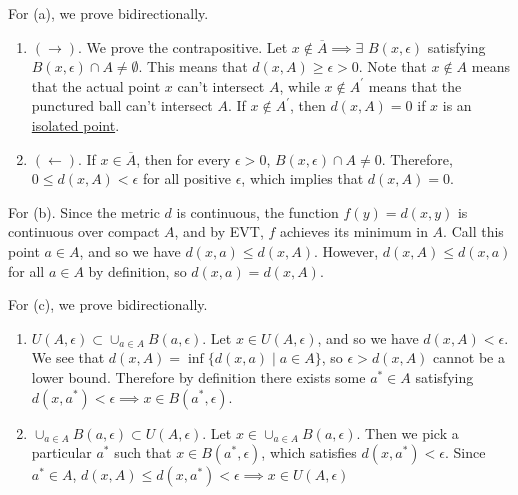   \begin{solution}
    For (a), we prove bidirectionally. 
    \begin{enumerate}
      \item $(\rightarrow)$. We prove the contrapositive. Let $x \not\in \overline{A} \implies \exists$ $B(x, \epsilon)$ satisfying $B(x, \epsilon) \cap A \neq \emptyset$. This means that $d(x, A) \geq \epsilon > 0$. Note that $x \not\in A$ means that the actual point $x$ can't intersect $A$, while $x \not\in A^\prime$ means that the punctured ball can't intersect $A$. If $x \not\in A^\prime$, then $d(x, A) = 0$ if $x$ is an \hyperref[def:isolated-point]{isolated point}. 

      \item $(\leftarrow)$. If $x \in \overline{A}$, then for every $\epsilon > 0$, $B(x, \epsilon) \cap A \neq 0$. Therefore, $0 \leq d(x, A) < \epsilon$ for all positive $\epsilon$, which implies that $d(x, A) = 0$. 
    \end{enumerate}
    For (b). Since the metric $d$ is continuous, the function $f(y) = d(x, y)$ is continuous over compact $A$, and by EVT, $f$ achieves its minimum in $A$. Call this point $a \in A$, and so we have $d(x, a) \leq d(x, A)$. However, $d(x, A) \leq d(x, a)$ for all $a \in A$ by definition, so $d(x, a) = d(x, A)$. 

    For (c), we prove bidirectionally. 
    \begin{enumerate}
      \item $U(A, \epsilon) \subset \cup_{a \in A} B(a, \epsilon)$. Let $x \in U(A, \epsilon)$, and so we have $d(x, A) < \epsilon$. We see that $d(x, A) = \inf \{d(x, a) \mid a \in A\}$, so $\epsilon > d(x, A)$ cannot be a lower bound. Therefore by definition there exists some $a^\ast \in A$ satisfying $d(x, a^\ast) < \epsilon \implies x \in B(a^\ast, \epsilon)$. 

      \item $\cup_{a \in A} B(a, \epsilon) \subset U(A, \epsilon)$. Let $x \in \cup_{a \in A} B(a, \epsilon)$. Then we pick a particular $a^\ast$ such that $x \in B(a^\ast, \epsilon)$, which satisfies $d(x, a^\ast) < \epsilon$. Since $a^\ast \in A$, $d(x, A) \leq d(x, a^\ast) < \epsilon \implies x \in U(A, \epsilon)$
    \end{enumerate}


\end{solution}
